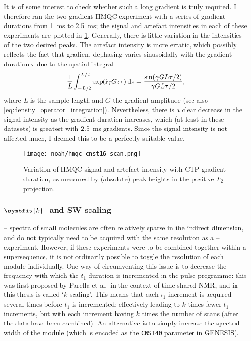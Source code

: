 It is of some interest to check whether such a long gradient is truly required.
I therefore ran the two-gradient HMQC experiment with a series of gradient durations from \qty{1}{\ms} to \qty{2.5}{\ms}; the signal and artefact intensities in each of these experiments are plotted in \cref{fig:hmqc_cnst16}.
Generally, there is little variation in the intensities of the two desired peaks.
The artefact intensity is more erratic, which possibly reflects the fact that gradient dephasing varies sinusoidally with the gradient duration $\tau$ due to the spatial integral
\begin{equation}
    \label{eq:gradient_dephasing}
    \frac{1}{L} \int_{-L/2}^{L/2} \exp(\mathrm{i} \gamma Gz\tau)\,\mathrm{d}z = \frac{\sin(\gamma G L\tau/2)}{\gamma GL\tau/2},
\end{equation}
where $L$ is the sample length and $G$ the gradient amplitude (see also \cref{eq:density_operator_integration}).
Nevertheless, there is a clear decrease in the signal intensity as the gradient duration increases, which (at least in these datasets) is greatest with \qty{2.5}{\ms} gradients.
Since the signal intensity is not affected much, I deemed this to be a perfectly suitable value.

\begin{figure}[!ht]
    \centering
    \texttt{[image: noah/hmqc\_cnst16\_scan.png]}%
    \caption[Variation of HMQC signal and artefact intensity with CTP gradient duration]{
        Variation of HMQC signal and artefact intensity with CTP gradient duration, as measured by (absolute) peak heights in the positive $F_2$ projection.
    }
    \label{fig:hmqc_cnst16}
\end{figure}



\subsubsection{$\symbfit{k}$- and SW-scaling}

\proton{}--\nitrogen{} spectra of small molecules are often relatively sparse in the indirect dimension, and do not typically need to be acquired with the same resolution as a \proton{}--\carbon{} experiment.
However, if these experiments were to be combined together within a supersequence, it is not ordinarily possible to toggle the resolution of each module individually.
One way of circumventing this issue is to decrease the frequency with which the \nitrogen{} $t_1$ duration is incremented in the pulse programme: this was first proposed by Parella et al.\ in the context of time-shared NMR\autocite{PerezTrujillo2007MRC,Parella2010CMR}, and in this thesis is called `$k$-scaling'.
This means that each $t_1$ increment is acquired several times before $t_1$ is incremented; effectively leading to $k$ times fewer $t_1$ increments, but with each increment having $k$ times the number of scans (after the data have been combined).
An alternative is to simply increase the spectral width of the \nitrogen{} module (which is encoded as the \texttt{CNST40} parameter in GENESIS).

